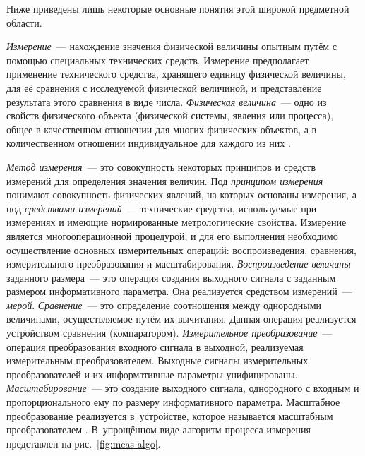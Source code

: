 \documentclass[a4paper, 14pt, titlepage]{extarticle}
\newcommand{\term}[1]{\emph{#1}}
\begin{document}
  Ниже приведены лишь некоторые основные понятия этой широкой предметной области.

  \term{Измерение}~--- нахождение значения физической величины опытным путём с помощью специальных
  технических средств. Измерение предполагает применение технического средства, хранящего единицу
  физической величины, для её сравнения с исследуемой физической величиной, и представление
  результата этого сравнения в виде числа.
  \term{Физическая величина}~--- одно из свойств физического объекта (физической системы, явления
  или процесса), общее в качественном отношении для многих физических объектов, а в количественном
  отношении индивидуальное для каждого из них \cite[с.~7]{rannev-iis}.

  \term{Метод измерения}~--- это совокупность некоторых принципов и средств измерений для
  определения значения величин. Под \term{принципом измерения} понимают совокупность физических явлений, на
  которых основаны измерения, а под \term{средствами измерений}~--- технические средства, используемые при
  измерениях и имеющие нормированные метрологические свойства. Измерение является
  многооперационной процедурой, и для его выполнения необходимо осуществление основных измерительных
  операций: воспроизведения, сравнения, измерительного преобразования и масштабирования.
  \term{Воспроизведение величины} заданного размера~--- это операция создания выходного сигнала с
  заданным размером информативного параметра. Она реализуется средством измерений~--- \term{мерой}.
  \term{Сравнение}~--- это определение соотношения между однородными величинами, осуществляемое
  путём их вычитания. Данная операция реализуется устройством сравнения (компаратором).
  \term{Измерительное преобразование}~--- операция преобразования входного сигнала в выходной,
  реализуемая измерительным преобразователем. Выходные сигналы измерительных преобразователей и их
  информативные параметры унифицированы.
  \term{Масштабирование}~--- это создание выходного сигнала, однородного с входным и
  пропорционального ему по размеру информативного параметра. Масштабное преобразование реализуется
  в~устройстве, которое называется масштабным преобразователем \cite[с.~16]{volkov-iis}.
  В~упрощённом виде алгоритм процесса измерения представлен на рис.~\ref{fig:meas-algo}.
\end{document}
